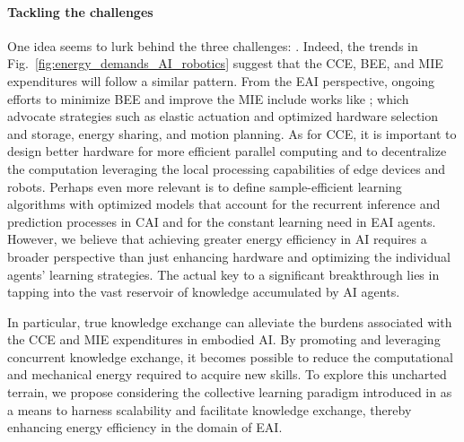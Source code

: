 \documentclass[12pt]{article}
\renewcommand{\emph}[1]{\textit{#1}}
\begin{document}
\paragraph*{\textbf{Tackling the challenges}}
One idea seems to lurk behind the three challenges: \emph{}. Indeed, the trends in Fig.~\ref{fig:energy_demands_AI_robotics} suggest that the CCE, BEE, and MIE expenditures will follow a similar pattern. From the EAI perspective, ongoing efforts to minimize BEE and improve the MIE include works like \cite{schroder2014, chalmers2015, mohammed2014, chemnitz2011}; which advocate strategies such as elastic actuation and optimized hardware selection and storage, energy sharing, and motion planning. As for CCE, it is important to design better hardware for more efficient parallel computing and to decentralize the computation leveraging the local processing capabilities of edge devices and robots. Perhaps even more relevant is to define sample-efficient learning algorithms with optimized models that account for the recurrent inference and prediction processes in CAI and for the constant learning need in EAI agents. However, we believe that achieving greater energy efficiency in AI requires a broader perspective than just enhancing hardware and optimizing the individual agents' learning strategies. The actual key to a significant breakthrough lies in tapping into the vast reservoir of knowledge accumulated by AI agents. 

In particular, true knowledge exchange can alleviate the burdens associated with the CCE and MIE expenditures in embodied AI. By promoting and leveraging concurrent knowledge exchange, it becomes possible to reduce the computational and mechanical energy required to acquire new skills. To explore this uncharted terrain, we propose considering the collective learning paradigm introduced in \cite{Haddadin2014SystemzumErstellen,Haddadin2015Systemgeneratingsets} as a means to harness scalability and facilitate knowledge exchange, thereby enhancing energy efficiency in the domain of EAI.


\end{document}
